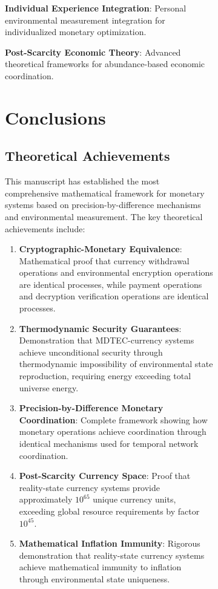 \documentclass[12pt,a4paper]{article}
\begin{document}
\begin{figure}[H]
\begin{figure}[H]
\textbf{Individual Experience Integration}: Personal environmental measurement integration for individualized monetary optimization.

\textbf{Post-Scarcity Economic Theory}: Advanced theoretical frameworks for abundance-based economic coordination.

\section{Conclusions}

\subsection{Theoretical Achievements}

This manuscript has established the most comprehensive mathematical framework for monetary systems based on precision-by-difference mechanisms and environmental measurement. The key theoretical achievements include:

\begin{enumerate}
\item \textbf{Cryptographic-Monetary Equivalence}: Mathematical proof that currency withdrawal operations and environmental encryption operations are identical processes, while payment operations and decryption verification operations are identical processes.

\item \textbf{Thermodynamic Security Guarantees}: Demonstration that MDTEC-currency systems achieve unconditional security through thermodynamic impossibility of environmental state reproduction, requiring energy exceeding total universe energy.

\item \textbf{Precision-by-Difference Monetary Coordination}: Complete framework showing how monetary operations achieve coordination through identical mechanisms used for temporal network coordination.

\item \textbf{Post-Scarcity Currency Space}: Proof that reality-state currency systems provide approximately $10^{65}$ unique currency units, exceeding global resource requirements by factor $10^{45}$.

\item \textbf{Mathematical Inflation Immunity}: Rigorous demonstration that reality-state currency systems achieve mathematical immunity to inflation through environmental state uniqueness.
\end{enumerate}


\end{figure}
\end{figure}
\end{document}
